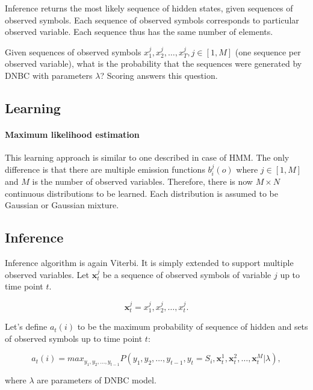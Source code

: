 \documentclass[thesis=B,english]{FITthesis}[2012/06/26]
\begin{document}
Inference returns the most likely sequence of hidden states, given sequences of observed symbols. Each sequence of observed symbols corresponds to particular observed variable. Each sequence thus has the same number of elements.

Given sequences of observed symbols $x_1^j, x_2^j, \dots, x_T^j, j \in [1,M]$ (one sequence per observed variable), what is the probability that the sequences were generated by DNBC with parameters $\lambda$? Scoring answers this question.

\subsection{Learning}

\paragraph{Maximum likelihood estimation}

This learning approach is similar to one described in case of HMM. The only difference is that there are multiple emission functions $b^j_i(o)$ where $j \in [1,M]$ and $M$ is the number of observed variables. Therefore, there is now $M \times N$ continuous distributions to be learned. Each distribution is assumed to be Gaussian or Gaussian mixture.

\subsection{Inference}

Inference algorithm is again Viterbi. It is simply extended to support multiple observed variables. Let $\textbf{x}_t^j$ be a sequence of observed symbols of variable $j$ up to time point $t$.

\begin{equation*}
\textbf{x}_t^j = x_1^j,x_2^j,\dots,x_t^j.
\end{equation*}

Let's define $a_t(i)$ to be the maximum probability of sequence of hidden and sets of observed symbols up to time point $t$:

\begin{equation} \label{eq:dnbc_viterbi_a}
a_t(i) = max_{y_1,y_2,\dots,y_{t-1}} P(y_1,y_2,\dots,y_{t-1},y_t = S_i,\textbf{x}_t^1,\textbf{x}_t^2,\dots,\textbf{x}_t^M| \lambda),
\end{equation}

where $\lambda$ are parameters of DNBC model.
\end{document}

